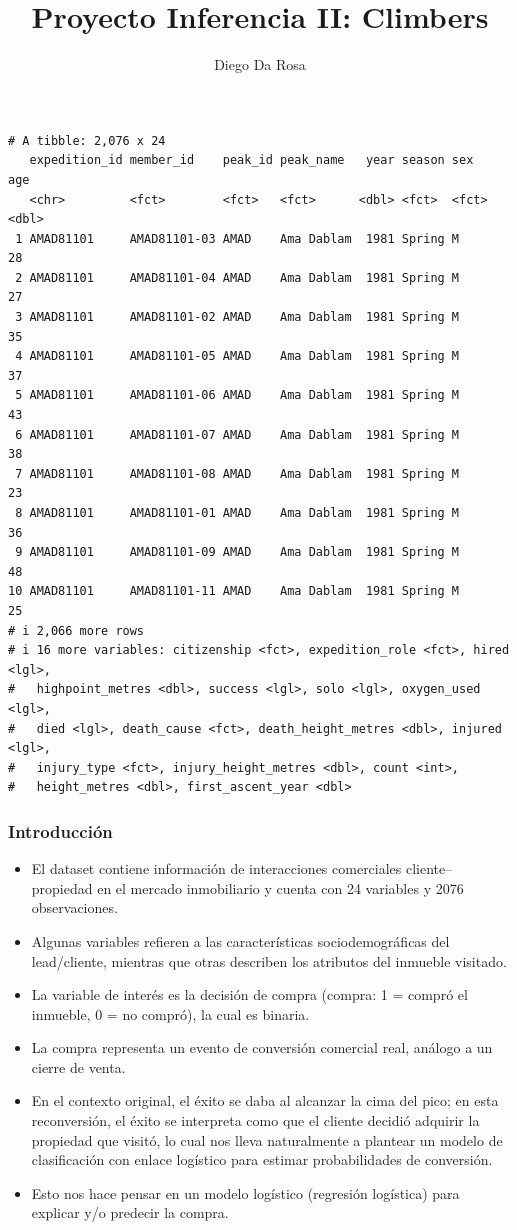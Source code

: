 \documentclass[
  letterpaper,
  DIV=11,
  numbers=noendperiod]{scrartcl}
\title{Proyecto Inferencia II: Climbers}
\author{Diego Da Rosa}
\date{}
\begin{document}
\maketitle


\begin{verbatim}
# A tibble: 2,076 x 24
   expedition_id member_id    peak_id peak_name   year season sex     age
   <chr>         <fct>        <fct>   <fct>      <dbl> <fct>  <fct> <dbl>
 1 AMAD81101     AMAD81101-03 AMAD    Ama Dablam  1981 Spring M        28
 2 AMAD81101     AMAD81101-04 AMAD    Ama Dablam  1981 Spring M        27
 3 AMAD81101     AMAD81101-02 AMAD    Ama Dablam  1981 Spring M        35
 4 AMAD81101     AMAD81101-05 AMAD    Ama Dablam  1981 Spring M        37
 5 AMAD81101     AMAD81101-06 AMAD    Ama Dablam  1981 Spring M        43
 6 AMAD81101     AMAD81101-07 AMAD    Ama Dablam  1981 Spring M        38
 7 AMAD81101     AMAD81101-08 AMAD    Ama Dablam  1981 Spring M        23
 8 AMAD81101     AMAD81101-01 AMAD    Ama Dablam  1981 Spring M        36
 9 AMAD81101     AMAD81101-09 AMAD    Ama Dablam  1981 Spring M        48
10 AMAD81101     AMAD81101-11 AMAD    Ama Dablam  1981 Spring M        25
# i 2,066 more rows
# i 16 more variables: citizenship <fct>, expedition_role <fct>, hired <lgl>,
#   highpoint_metres <dbl>, success <lgl>, solo <lgl>, oxygen_used <lgl>,
#   died <lgl>, death_cause <fct>, death_height_metres <dbl>, injured <lgl>,
#   injury_type <fct>, injury_height_metres <dbl>, count <int>,
#   height_metres <dbl>, first_ascent_year <dbl>
\end{verbatim}

\subsubsection{Introducción}\label{introducciuxf3n}

\begin{itemize}
\item
  El dataset contiene información de interacciones comerciales
  cliente--propiedad en el mercado inmobiliario y cuenta con 24
  variables y 2076 observaciones.
\item
  Algunas variables refieren a las características sociodemográficas del
  lead/cliente, mientras que otras describen los atributos del inmueble
  visitado.
\item
  La variable de interés es la decisión de compra (compra: 1 = compró el
  inmueble, 0 = no compró), la cual es binaria.
\item
  La compra representa un evento de conversión comercial real, análogo a
  un cierre de venta.
\item
  En el contexto original, el éxito se daba al alcanzar la cima del
  pico; en esta reconversión, el éxito se interpreta como que el cliente
  decidió adquirir la propiedad que visitó, lo cual nos lleva
  naturalmente a plantear un modelo de clasificación con enlace
  logístico para estimar probabilidades de conversión.
\item
  Esto nos hace pensar en un modelo logístico (regresión logística) para
  explicar y/o predecir la compra.
\end{itemize}
\end{document}
